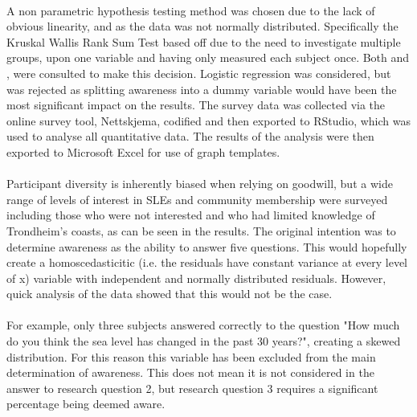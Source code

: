 \paragraph{}
A non parametric hypothesis testing method was chosen due to the lack of obvious linearity, and as the data was not normally distributed. Specifically the Kruskal Wallis Rank Sum Test based off \cite{hollander_nonparametric_2014} due to the need to investigate multiple groups, upon one variable and having only measured each subject once. Both \cite{tasman_how_2014} and \cite{hollander_nonparametric_2014}, were consulted to make this decision. Logistic regression was considered, but was rejected as splitting awareness into a dummy variable would have been the most significant impact on the results. The survey data was collected via the online survey tool, Nettskjema, codified and then exported to RStudio, which was used to analyse all quantitative data. The results of the analysis were then exported to Microsoft Excel for use of graph templates.
\paragraph{}
Participant diversity is inherently biased when relying on goodwill, but a wide range of levels of interest in SLEs and community membership were surveyed including those who were not interested and who had limited knowledge of Trondheim’s coasts, as can be seen in the results. The original intention was to determine awareness as the ability to answer five questions. This would hopefully create a homoscedasticitic (i.e. the residuals have constant variance at every level of x) variable with independent and normally distributed residuals. However, quick analysis of the data showed that this would not be the case.
\paragraph{}
For example, only three subjects answered correctly to the question "How much do you think the sea level has changed in the past 30 years?", creating a skewed distribution. For this reason this variable has been excluded from the main determination of awareness. This does not mean it is not considered in the answer to research question 2, but research question 3 requires a significant percentage being deemed aware. 
